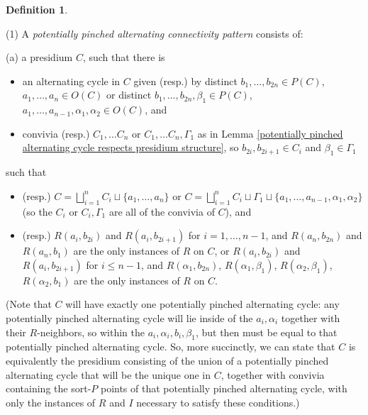 \documentclass{amsart}
\theoremstyle{definition}
\newtheorem{definition}[theorem]{Definition}
\theoremstyle{remark}
\numberwithin{equation}{section}
\begin{document}
\begin{definition}
      \label{potentially pinched alternating connectivity pattern}
      
      (1) A \textit{potentially pinched alternating connectivity pattern} consists of:


      (a) a presidium $C$, such that there is 
      

\begin{itemize}
    \item an alternating cycle in $C$ given (resp.) by distinct $b_{1}, \ldots, b_{2n} \in P(C)$, $a_1, \ldots, a_n \in O(C)$ or distinct $b_{1}, \ldots, b_{2n}, \beta_1 \in P(C)$, $a_1, \ldots, a_{n-1}, \alpha_1, \alpha_2 \in O(C)$, and
    \item convivia (resp.) $C_{1}, \ldots C_{n}$ or $C_{1}, \ldots C_{n}, \Gamma_{1}$ as in Lemma \ref{potentially pinched alternating cycle respects presidium structure}, so $b_{2i}, b_{2i+1} \in C_{i}$ and $\beta_{1} \in \Gamma_{1}$
\end{itemize}
      
      
      

      
      
      such that

      \begin{itemize}
          \item (resp.) $C = \bigsqcup^{n}_{i=1} C_{i} \sqcup  \{a_{1}, \ldots, a_{n}\} $ or  $C = \bigsqcup^{n}_{i=1} C_{i} \sqcup \Gamma_{1} \sqcup \{a_{1}, \ldots, a_{n-1}, \alpha_{1}, \alpha_{2}\} $ (so the $C_{i}$ or $C_{i}, \Gamma_{1}$ are all of the convivia of $C$), and
          \item (resp.) $R(a_i, b_{2i})$ and $R(a_i, b_{2i+1})$ for $i= 1, \ldots, n-1$, and $R(a_n, b_{2n})$ and $R(a_n, b_{1})$ are the only instances of $R$ on $C$, or $R(a_i, b_{2i})$ and $R(a_i, b_{2i+1})$ for $i \leq n-1$, and $R(\alpha_{1}, b_{2n})$, $R(\alpha_1, \beta_1)$, $R(\alpha_2, \beta_1)$, $R(\alpha_2, b_1)$ are the only instances of $R$ on $C$.
      \end{itemize}
      
  


(Note that $C$ will have exactly one potentially pinched alternating cycle: any potentially pinched alternating cycle will lie inside of the $a_{i}, \alpha_{i}$ together with their $R$-neighbors, so within the $a_{i}, \alpha_{i}, b_{i}, \beta_{1}$, but then must be equal to that potentially pinched alternating cycle. So, more succinctly, we can state that $C$ is equivalently the presidium consisting of the union of a potentially pinched alternating cycle that will be the unique one in $C$, together with convivia containing the sort-$P$ points of that potentially pinched alternating cycle, with only the instances of $R$ and $I$ necessary to satisfy these conditions.)




\end{definition}
\end{document}
